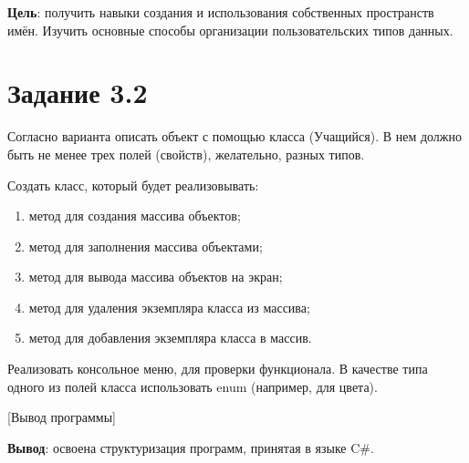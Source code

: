 \documentclass{bsuir}
\newcommand{\csharp}{C{\liberationrm\#}}
\begin{document}
    \maketitle

    \textbf{Цель}: получить навыки создания и использования собственных
    пространств имён. Изучить основные способы организации пользовательских
    типов данных.

    \section*{Задание 3.2}

    Согласно варианта описать объект с помощью класса (Учащийся). В нем должно
    быть не менее трех полей (свойств), желательно, разных типов.

    Создать класс, который будет реализовывать:

    \begin{enumerate}
        \item метод для создания массива объектов;
        \item метод для заполнения массива объектами;
        \item метод для вывода массива объектов на экран;
        \item метод для удаления экземпляра класса из массива;
        \item метод для добавления экземпляра класса в массив.
    \end{enumerate}

    Реализовать консольное меню, для проверки функционала. В качестве типа
    одного из полей класса использовать enum (например, для цвета).


    [Вывод программы]

    \textbf{Вывод}: освоена структуризация программ, принятая в языке \csharp.
\end{document}
